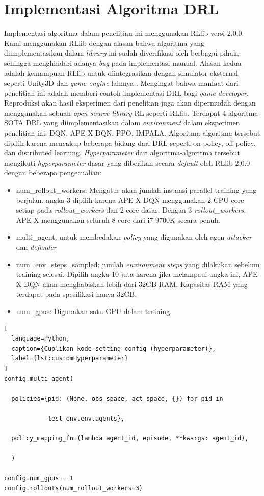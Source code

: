 \section{Implementasi Algoritma DRL}
Implementasi algoritma dalam penelitian ini menggunakan RLlib versi 2.0.0.
Kami menggunakan RLlib dengan alasan bahwa algoritma yang diimplementasikan dalam \emph{library} ini
sudah diverifikasi oleh berbagai pihak, sehingga menghindari adanya \emph{bug} pada implementasi manual.
Alasan kedua adalah kemampuan RLlib untuk diintegrasikan dengan simulator eksternal seperti Unity3D
dan \emph{game engine} lainnya \citep{rllibDocumentation}.
Mengingat bahwa manfaat dari penelitian ini adalah memberi contoh implementasi DRL
bagi \emph{game developer}.
Reproduksi akan hasil eksperimen dari penelitian juga akan dipermudah dengan 
menggunakan sebuah \emph{open source library} RL seperti RLlib.
Terdapat 4 algoritma SOTA DRL yang diimplementasikan dalam \emph{environment} dalam
eksperimen penelitian ini: DQN, APE-X DQN, PPO, IMPALA. 
Algoritma-algoritma tersebut dipilih karena mencakup beberapa bidang dari DRL seperti
on-policy, off-policy, dan distributed learning.
\emph{Hyperparameter} dari algoritma-algoritma tersebut mengikuti \emph{hyperparameter}
dasar yang diberikan secara \emph{default} oleh RLlib 2.0.0 dengan beberapa pengecualian:
\begin{itemize}
  \item num\_rollout\_workers: Mengatur akan jumlah instansi parallel training yang berjalan.
  angka 3 dipilih karena APE-X DQN menggunakan 2 CPU core setiap pada \emph{rollout\_workers}
  dan 2 core dasar. Dengan 3 \emph{rollout\_workers}, APE-X menggunakan seluruh 8 core dari i7 9700K
  secara penuh.

  \item multi\_agent: untuk membedakan \emph{policy}
  yang digunakan oleh agen \emph{attacker} dan \emph{defender}

  \item num\_env\_steps\_sampled: jumlah \emph{environment steps} yang dilakukan sebelum training selesai.
  Dipilih angka 10 juta karena jika melampaui angka ini, APE-X DQN akan menghabiskan lebih dari 32GB RAM.
  Kapasitas RAM yang terdapat pada spesifikasi hanya 32GB.
  
  \item num\_gpus: Digunakan satu GPU dalam training.
\end{itemize}

\begin{lstlisting}[
  language=Python,
  caption={Cuplikan kode setting config (hyperparameter)},
  label={lst:customHyperparameter}
]
config.multi_agent(

  policies={pid: (None, obs_space, act_space, {}) for pid in

            test_env.env.agents},

  policy_mapping_fn=(lambda agent_id, episode, **kwargs: agent_id),

  )  

config.num_gpus = 1
config.rollouts(num_rollout_workers=3)
    
\end{lstlisting}


